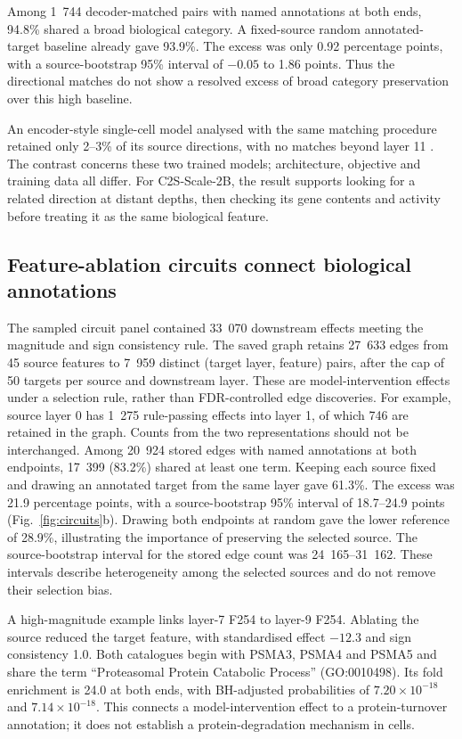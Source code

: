 \documentclass[review,authoryear,12pt]{elsarticle}
\begin{document}
Among 1~744 decoder-matched pairs with named annotations at both ends, 94.8\% shared a broad
biological category. A fixed-source random annotated-target baseline already gave 93.9\%.
The excess was only 0.92 percentage points, with a source-bootstrap 95\% interval of
$-0.05$ to 1.86 points. Thus the directional matches do not show a resolved excess of broad
category preservation over this high baseline.

An encoder-style single-cell model analysed with the same matching procedure retained only
2--3\% of its source directions, with no matches beyond layer 11 \citep{ref7}.
The contrast concerns these two trained models; architecture, objective and training data all
differ. For C2S-Scale-2B, the result supports looking for a related direction at distant depths,
then checking its gene contents and activity before treating it as the same biological feature.

\subsection{Feature-ablation circuits connect biological annotations}

The sampled circuit panel contained 33~070 downstream effects meeting the magnitude and sign
consistency rule. The saved graph retains 27~633 edges from 45 source features to 7~959 distinct
(target layer, feature) pairs, after the cap of 50 targets per source and downstream layer.
These are model-intervention effects under a selection rule, rather than FDR-controlled edge
discoveries. For example, source layer 0 has 1~275 rule-passing effects into layer 1, of which
746 are retained in the graph. Counts from the two representations should not be interchanged.
Among 20~924 stored edges with named annotations at both endpoints, 17~399 (83.2\%) shared at
least one term. Keeping each source fixed and drawing an annotated target from the same layer
gave 61.3\%. The excess was 21.9 percentage points, with a source-bootstrap 95\% interval of
18.7--24.9 points (Fig.~\ref{fig:circuits}b). Drawing both endpoints at random gave the lower
reference of 28.9\%, illustrating the importance of preserving the selected source.
The source-bootstrap interval for the stored edge count was 24~165--31~162. These intervals
describe heterogeneity among the selected sources and do not remove their selection bias.

A high-magnitude example links layer-7 F254 to layer-9 F254. Ablating the source reduced the
target feature, with standardised effect $-12.3$ and sign consistency 1.0. Both catalogues begin
with PSMA3, PSMA4 and PSMA5 and share the term ``Proteasomal Protein Catabolic Process''
(GO:0010498). Its fold enrichment is 24.0 at both ends, with BH-adjusted probabilities of
$7.20\times10^{-18}$ and $7.14\times10^{-18}$. This connects a model-intervention effect to a
protein-turnover annotation; it does not establish a protein-degradation mechanism in cells.
\end{document}
